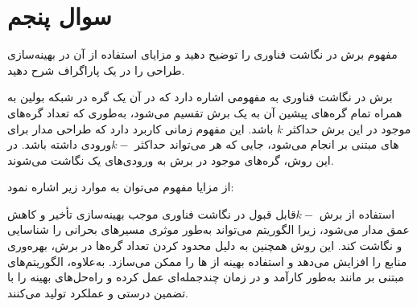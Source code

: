 \section{سوال پنجم}


مفهوم برش  در نگاشت فناوری  را توضیح دهید و مزایای استفاده از آن در بهینه‌سازی طراحی را در یک پاراگراف شرح دهید.

\begin{qsolve}
	برش   در نگاشت فناوری  به مفهومی اشاره دارد که در آن یک گره در شبکه بولین به همراه تمام گره‌های پیشین آن به یک برش تقسیم می‌شود، به‌طوری که تعداد گره‌های موجود در این برش حداکثر $k$ باشد. این مفهوم زمانی کاربرد دارد که طراحی مدار برای های مبتنی بر  انجام می‌شود، جایی که هر  می‌تواند حداکثر $k-$ورودی داشته باشد. در این روش، گره‌های موجود در برش به ورودی‌های یک  نگاشت می‌شوند.
	
	از مزایا مفهوم می‌توان به موارد زیر اشاره نمود:
	
	استفاده از برش $k-$قابل قبول در نگاشت فناوری موجب بهینه‌سازی تأخیر و کاهش عمق مدار می‌شود، زیرا الگوریتم می‌تواند به‌طور موثری مسیرهای بحرانی را شناسایی و نگاشت کند. این روش همچنین به دلیل محدود کردن تعداد گره‌ها در برش، بهره‌وری منابع  را افزایش می‌دهد و استفاده بهینه از ها را ممکن می‌سازد. به‌علاوه، الگوریتم‌های مبتنی بر  مانند  به‌طور کارآمد و در زمان چندجمله‌ای عمل کرده و راه‌حل‌های بهینه را با تضمین درستی و عملکرد تولید می‌کنند.
\end{qsolve}